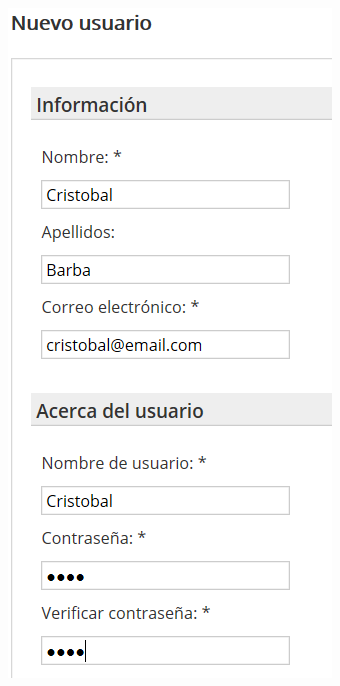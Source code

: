 \documentclass{article}
\begin{document}
\begin{itemize}
\begin{center}
\begin{figure}[h!]
\begin{subfigure}[!]{0.25\textwidth}
        \end{subfigure}       
        \begin{subfigure}[!]{0.25\textwidth} 
            \includegraphics[width=\textwidth]{images/cristobal.png}
        \end{subfigure}
\end{figure}
\end{center}
\end{itemize}
\end{document}
